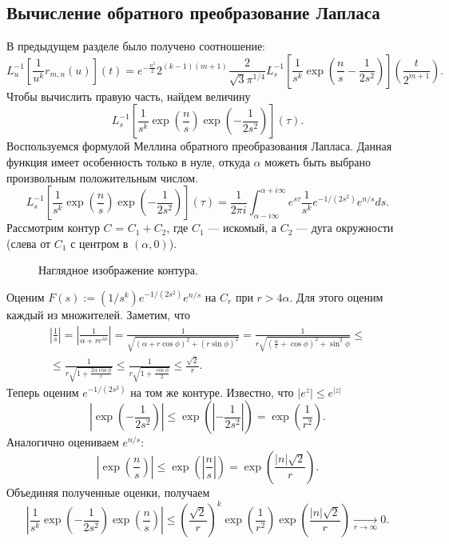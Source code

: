 \documentclass[../paper.tex]{subfiles}
\begin{document}
\subsection{Вычисление обратного преобразование Лапласа}
В предыдущем разделе было получено соотношение:
\begin{equation}\label{eq:invlap}
    L^{-1}_u \left[ \frac{1}{u^k} r_{m,n}(u) \right](t) =
%
    e^{-\frac{n^2}{2}} 2^{(k-1)(m+1)} \frac{2}{\sqrt{3} \pi^{1/4}}
    L^{-1}_s \left[ \frac{1}{s^k}
    \exp \left(\frac{n}{s} - \frac{1}{2 s^2 }
    \right)
    \right] \left( \frac{t}{2^{m+1}} \right)
.\end{equation}
Чтобы вычислить правую часть, найдем величину
\begin{equation}\label{eq:invlap_as_int}
    L^{-1}_s \left[ \frac{1}{s^k}
    \exp \left(\frac{n}{s}\right)
    \exp \left(-\frac{1}{2 s^2 }\right)
    \right] \left( \tau \right)
.\end{equation}
Воспользуемся формулой Меллина обратного преобразования Лапласа. Данная функция имеет особенность только в нуле, откуда $\alpha$ можеть быть выбрано произвольным положительным числом.
\[
    L^{-1}_s \left[ \frac{1}{s^k}
    \exp \left(\frac{n}{s}\right)
    \exp \left(-\frac{1}{2 s^2 }\right)
    \right] \left( \tau \right) =
%
    \frac{1}{2\pi i}\int_{\alpha-i\infty}^{\alpha+i\infty} e^{s\tau} \frac{1}{s^k} e^{-1/(2s^2)} e^{n/s} ds
.\]
Рассмотрим контур $C$ = $C_1 + C_2$, где $C_1$ --- искомый, а $C_2$ --- дуга окружности (слева от $C_1$ с центром в $(\alpha, 0)$).
\begin{figure}[ht]
	\centering
	
	\caption{Наглядное изображение контура.}
\end{figure}

Оценим $F(s) := (1/s^k) e^{-1/(2s^2)} e^{n/s}$ на $C_r$ при $r > 4\alpha$. Для этого оценим каждый из множителей. Заметим, что
\begin{multline*}
    \left|\frac{1}{s}\right| = 
    \left|\frac{1}{\alpha+re^{i\phi}}\right| =
    \frac{1}{\sqrt{\left(\alpha+r\cos\phi\right)^2 + \left(r\sin\phi\right)^2}} =
    \frac{1}{r\sqrt{\left(\frac{\alpha}{r} + \cos\phi\right)^2 + \sin^2\phi}}
\le \\ \le
    \frac{1}{r\sqrt{1 + \frac{2\alpha\cos\phi}{r}}} \le
    \frac{1}{r\sqrt{1 + \frac{\cos\phi}{2}}} \le
    \frac{\sqrt{2}}{r} 
.\end{multline*}
Теперь оценим $e^{-1/(2s^2)}$ на том же контуре. Известно, что $|e^{z}| \le e^{|z|}$
\[
    \left|\exp\left(-\frac{1}{2s^2}\right)\right| \le
    \exp\left(\left|-\frac{1}{2s^2}\right|\right) =
    \exp\left(\frac{1}{r^2}\right)
.\]
Аналогично оцениваем $e^{n/s}$:
\[
    \left| \exp\left( \frac{n}{s} \right)  \right| \le 
    \exp\left(\left| \frac{n}{s} \right|\right) =
    \exp\left( \frac{|n|\sqrt{2} }{r} \right) 
.\]
Объединяя полученные оценки, получаем
\[
    \left|\frac{1}{s^k} \exp\left(-\frac{1}{2s^2}\right) \exp\left(\frac{n}{s}\right)\right| \le
    \left(\frac{\sqrt{2}}{r}\right)^k \exp\left(\frac{1}{r^2}\right) \exp\left(\frac{|n|\sqrt{2}}{r}\right)
    \xrightarrow[r \to \infty]{} 0
.\]
\end{document}
